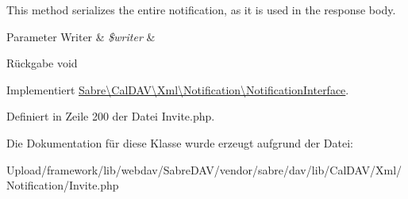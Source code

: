This method serializes the entire notification, as it is used in the response body.


\begin{DoxyParams}[1]{Parameter}
Writer & {\em \$writer} & \\
\hline
\end{DoxyParams}
\begin{DoxyReturn}{Rückgabe}
void 
\end{DoxyReturn}


Implementiert \mbox{\hyperlink{interface_sabre_1_1_cal_d_a_v_1_1_xml_1_1_notification_1_1_notification_interface_abb545ebd302b3bdf972d159065c6a8b4}{Sabre\textbackslash{}\+Cal\+D\+A\+V\textbackslash{}\+Xml\textbackslash{}\+Notification\textbackslash{}\+Notification\+Interface}}.



Definiert in Zeile 200 der Datei Invite.\+php.



Die Dokumentation für diese Klasse wurde erzeugt aufgrund der Datei\+:\begin{DoxyCompactItemize}
\item 
Upload/framework/lib/webdav/\+Sabre\+D\+A\+V/vendor/sabre/dav/lib/\+Cal\+D\+A\+V/\+Xml/\+Notification/Invite.\+php\end{DoxyCompactItemize}
